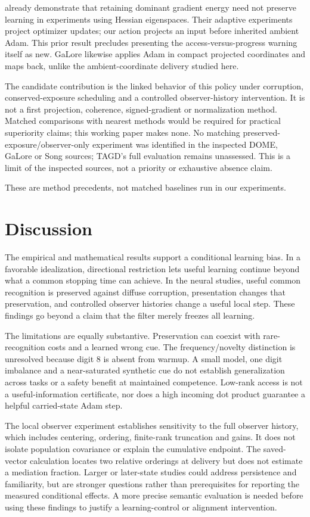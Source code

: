 \documentclass[10pt]{article}
\begin{document}
\citet{song2025tinysubspacesv3} already demonstrate that retaining dominant gradient energy need not preserve learning in experiments using Hessian eigenspaces. Their adaptive experiments project optimizer updates; our action projects an input before inherited ambient Adam. This prior result precludes presenting the access-versus-progress warning itself as new. GaLore likewise applies Adam in compact projected coordinates and maps back, unlike the ambient-coordinate delivery studied here.

The candidate contribution is the linked behavior of this policy under corruption, conserved-exposure scheduling and a controlled observer-history intervention. It is not a first projection, coherence, signed-gradient or normalization method. Matched comparisons with nearest methods would be required for practical superiority claims; this working paper makes none. No matching preserved-exposure/observer-only experiment was identified in the inspected DOME, GaLore or Song sources; TAGD's full evaluation remains unassessed. This is a limit of the inspected sources, not a priority or exhaustive absence claim.

These are method precedents, not matched baselines run in our experiments.

\section{Discussion}
The empirical and mathematical results support a conditional learning bias. In a favorable idealization, directional restriction lets useful learning continue beyond what a common stopping time can achieve. In the neural studies, useful common recognition is preserved against diffuse corruption, presentation changes that preservation, and controlled observer histories change a useful local step. These findings go beyond a claim that the filter merely freezes all learning.

The limitations are equally substantive. Preservation can coexist with rare-recognition costs and a learned wrong cue. The frequency/novelty distinction is unresolved because digit 8 is absent from warmup. A small model, one digit imbalance and a near-saturated synthetic cue do not establish generalization across tasks or a safety benefit at maintained competence. Low-rank access is not a useful-information certificate, nor does a high incoming dot product guarantee a helpful carried-state Adam step.

The local observer experiment establishes sensitivity to the full observer history, which includes centering, ordering, finite-rank truncation and gains. It does not isolate population covariance or explain the cumulative endpoint. The saved-vector calculation locates two relative orderings at delivery but does not estimate a mediation fraction. Larger or later-state studies could address persistence and familiarity, but are stronger questions rather than prerequisites for reporting the measured conditional effects. A more precise semantic evaluation is needed before using these findings to justify a learning-control or alignment intervention.
\end{document}
